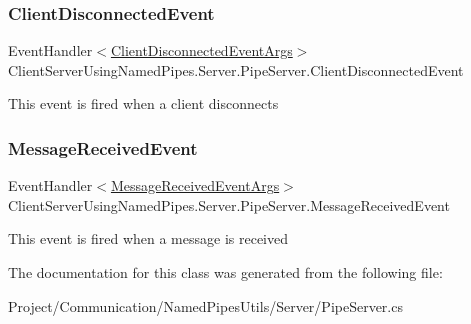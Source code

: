 \subsubsection{\texorpdfstring{Client\+Disconnected\+Event}{ClientDisconnectedEvent}}
{\footnotesize\ttfamily Event\+Handler$<$\hyperlink{class_client_server_using_named_pipes_1_1_interfaces_1_1_client_disconnected_event_args}{Client\+Disconnected\+Event\+Args}$>$ Client\+Server\+Using\+Named\+Pipes.\+Server.\+Pipe\+Server.\+Client\+Disconnected\+Event}



This event is fired when a client disconnects 

\mbox{\label{class_client_server_using_named_pipes_1_1_server_1_1_pipe_server_a7fcb193714e540b9a5c6d13b9b918c74}} 
\subsubsection{\texorpdfstring{Message\+Received\+Event}{MessageReceivedEvent}}
{\footnotesize\ttfamily Event\+Handler$<$\hyperlink{class_client_server_using_named_pipes_1_1_interfaces_1_1_message_received_event_args}{Message\+Received\+Event\+Args}$>$ Client\+Server\+Using\+Named\+Pipes.\+Server.\+Pipe\+Server.\+Message\+Received\+Event}



This event is fired when a message is received 



The documentation for this class was generated from the following file\+:\begin{DoxyCompactItemize}
\item 
Project/\+Communication/\+Named\+Pipes\+Utils/\+Server/Pipe\+Server.\+cs\end{DoxyCompactItemize}
